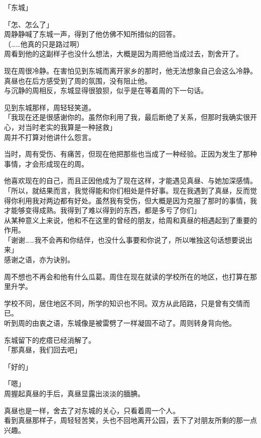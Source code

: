 「东城」

「怎、怎么了」\\

周静静喊了东城一声，得到了他仿佛不知所措似的回答。\\

（……他真的只是路过啊）\\

周看到他的这副样子也没什么想法，大概是因为周把他当成过去，割舍开了。

现在周很冷静。在害怕见到东城而离开家乡的那时，他无法想象自己会这么冷静。真昼也在后方感受到了周的氛围，没有阻止他。\\

与沉静的周相反，东城显得很狼狈，似乎是在等着周的下一句话。

见到东城那样，周轻轻笑道。\\

「我现在还是很感谢你的。虽然你利用了我，最后断绝了关系，但那时我确实很开心，对当时老实的我算是一种拯救」\\

周并不打算对他讲什么怨言。

当时，周有受伤、有痛苦，但现在他把那些也当成了一种经验。正因为发生了那种事情，才会形成现在的周。

他喜欢现在的自己，而且正因他成为了现在这样，才能遇见真昼、与她加深感情。\\

「所以，就结果而言，我觉得能和你们相处是件好事。现在我遇到了真昼，反而觉得你利用我对两边都有好处。虽然我有受伤，但大概是因为克服了那时的事情，我才能够变得成熟。我得到了难以得到的东西，都是多亏了你们」\\

从某种意义上来说，他和不在这里的曾经的朋友，给周和真昼的相遇起到了重要的作用。\\

「谢谢……我不会再和你结伴，也没什么事要和你说了，所以唯独这句话想要说出来」\\

感谢之语，亦为诀别。

周不想也不再会和他有什么瓜葛。周住在现在就读的学校所在的地区，也打算在那里升学。

学校不同，居住地区不同，所学的知识也不同。双方从此陌路，只是曾有交情而已。\\

听到周的由衷之语，东城像是被雷劈了一样凝固不动了。周则转身背向他。

东城留下的疙瘩已经消解了。\\

「那真昼，我们回去吧」

「好的」

「嗯」\\

周握起真昼的手后，真昼显露出淡淡的腼腆。

真昼也是一样，舍去了对东城的关心，只看着周一个人。\\

看到真昼那样子，周轻轻苦笑，头也不回地离开公园，丢下了对朋友所剩的那一点兴趣。
